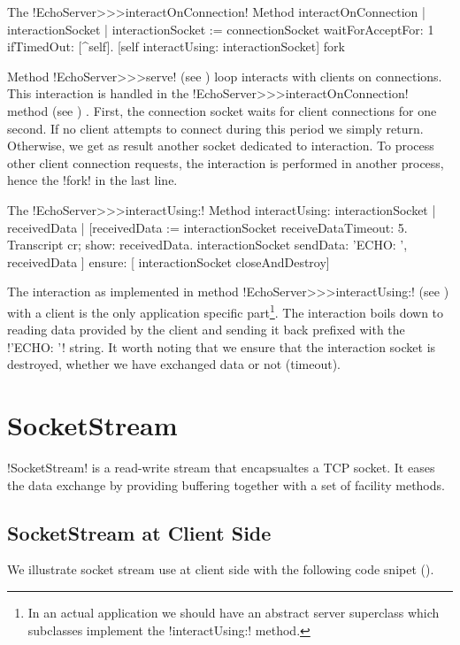 \documentclass[a4paper,10pt,twoside]{book}
\begin{document}
\begin{method}{The \ct!EchoServer>>>interactOnConnection! Method}
interactOnConnection
	| interactionSocket |
	interactionSocket := connectionSocket waitForAcceptFor: 1 ifTimedOut: [^self].
	[self interactUsing: interactionSocket] fork
\end{method}

Method \ct!EchoServer>>>serve! (see ) loop interacts with clients on connections.
This interaction is handled in the \ct!EchoServer>>>interactOnConnection! method (see ) .
First, the connection socket waits for client connections for one second.
If no client attempts to connect during this period we simply return.
Otherwise, we get as result another socket dedicated to interaction.
To process other client connection requests, the interaction is performed in another process, hence the \ct!fork! in the last line.

\begin{method}{The \ct!EchoServer>>>interactUsing:! Method}
interactUsing: interactionSocket
	| receivedData |
	[receivedData := interactionSocket receiveDataTimeout: 5.
	 Transcript cr; show: receivedData.
	 interactionSocket sendData: 'ECHO: ', receivedData
	] ensure: [
	 interactionSocket closeAndDestroy]
\end{method}

The interaction as implemented in method \ct!EchoServer>>>interactUsing:! (see ) with a client is the only application specific part\footnote{In an actual application we should have an abstract server superclass which subclasses implement the \ct!interactUsing:! method.}.
The interaction boils down to reading data provided by the client and sending it back prefixed with the \ct!'ECHO: '! string.
It worth noting that we ensure that the interaction socket is destroyed, whether we have exchanged data or not (timeout).

\section{SocketStream}
\label{sec:socketStream}
\ct!SocketStream! is a read-write stream that encapsualtes a TCP socket.
It eases the data exchange by providing buffering together with a set of facility methods.

\subsection{SocketStream at Client Side}
We illustrate socket stream use at client side with the following code snipet ().
\end{document}
